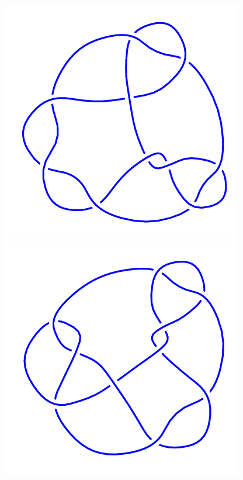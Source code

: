 \begin{figure}[H]
\begin{minipage}[b]{.18\linewidth}
    \end{minipage}
    \begin{minipage}[b]{.18\linewidth}
        \centering
        \includegraphics[width=\linewidth]{../data/10_39.png}
    \end{minipage}
    \begin{minipage}[b]{.18\linewidth}
        \centering
        \includegraphics[width=\linewidth]{../data/10_40.png}

\end{minipage}
\end{figure}
